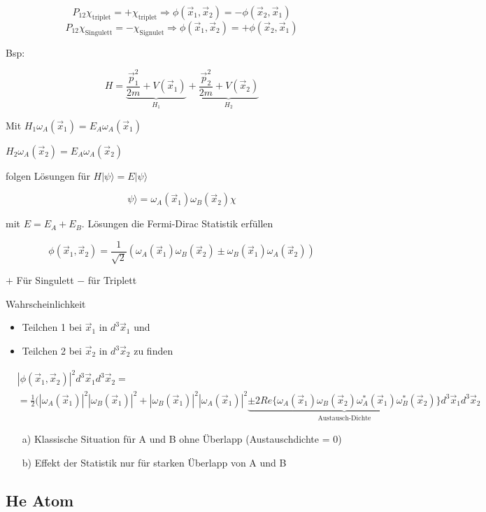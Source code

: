 \[P_{12}\chi_{\text{triplet}}= +\chi_{\text{triplet}} \Rightarrow \phi(\vec x_1,\vec x_2) = -\phi(\vec x_2,\vec x_1)\]
\[P_{12}\chi_{\text{Singulett}}= -\chi_{\text{Signulet}} \Rightarrow \phi(\vec x_1,\vec x_2) = +\phi(\vec x_2,\vec x_1)\]

Bsp:

\[H = \underbrace{\frac{\vec p_1^2}{2m}+V(\vec x_1)}_{H_1}+ \underbrace{\frac{\vec p_2^2}{2m}+V(\vec x_2)}_{H_2} \]

Mit \(H_{1}\omega_A(\vec x_1) = E_A\omega_A(\vec x_1)\)

\(H_{2}\omega_A(\vec x_2) = E_A\omega_A(\vec x_2)\)

folgen Lösungen für \(H|\psi\rangle =E|\psi\rangle \)

\[\psi\rangle = \omega_A(\vec x_1) \omega_B(\vec x_2) \chi\]

mit \(E= E_A+E_B\). Lösungen die Fermi-Dirac Statistik erfüllen

\[\phi(\vec x_1,\vec x_2) = \frac{1}{\sqrt{2}}(\omega_A(\vec x_1) \omega_B(\vec x_2) \pm \omega_B(\vec x_1) \omega_A(\vec x_2)) \]

\(+\) Für Singulett \(-\) für Triplett

Wahrscheinlichkeit

\begin{itemize}
\item Teilchen 1 bei \(\vec x_1\) in \(d^3\vec x_1\) und
\item Teilchen 2 bei \(\vec x_2\) in \(d^3\vec x_2\) zu finden
\end{itemize}


\begin{align}
&|\phi(\vec x_1,\vec x_2)|^2 d^3\vec x_1 d^3\vec x_2 =\\
&= \frac{1}{2}(|\omega_A(\vec x_1)|^2|\omega_B(\vec x_1)|^2+|\omega_B(\vec x_1)|^2|\omega_A(\vec x_1)|^2 \underbrace{ \pm 2Re\{\omega_A(\vec x_1) \omega_B(\vec x_2)\omega_A^*(\vec x_1) \omega_B^*(\vec x_2) \}}_{\text{Austausch-Dichte}}d^3\vec x_1d^3\vec x_2
\end{align}

\begin{enumerate}
\item[a)] Klassische Situation für A und B ohne Überlapp (Austauschdichte = 0)
\item[b)] Effekt der Statistik nur für starken Überlapp von A und B
\end{enumerate}


\subsection{He Atom}

